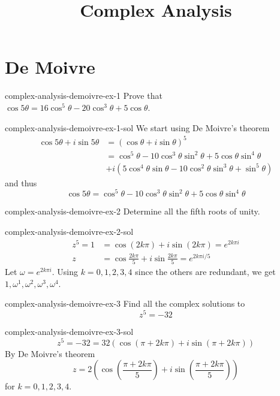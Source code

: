 \documentclass[preview]{standalone}
\begin{document}
\title{Complex Analysis}
\genpage

\section{De Moivre}

\begin{snippetexercise}{complex-analysis-demoivre-ex-1}{}
    Prove that \(\cos5\theta = 16\cos^5\theta - 20\cos^3\theta+5\cos\theta\).
\end{snippetexercise}

\begin{snippetsolution}{complex-analysis-demoivre-ex-1-sol}{}
    We start using De Moivre's theorem
    \begin{align*}
        \cos5\theta + i\sin5\theta &= (\cos\theta + i\sin\theta)^5 \\
        &= \cos^5\theta - 10\cos^3\theta\sin^2\theta + 5\cos\theta\sin^4\theta \\
            &+ i(5\cos^4\theta\sin\theta -10\cos^2\theta\sin^3\theta + \sin^5\theta)
    \end{align*}
    and thus
    \[ \cos5\theta = \cos^5\theta - 10\cos^3\theta\sin^2\theta + 5\cos\theta\sin^4\theta \]
\end{snippetsolution}

\begin{snippetexercise}{complex-analysis-demoivre-ex-2}{}
    Determine all the fifth roots of unity.
\end{snippetexercise}

\begin{snippetsolution}{complex-analysis-demoivre-ex-2-sol}{}
    \begin{align*}
        z^5 = 1 &= \cos (2k\pi) + i\sin(2k\pi) = e^{2k\pi i} \\
        z &= \cos \frac{2k\pi}{5} + i \sin \frac{2k\pi}{5} = e^{2k\pi i / 5}
    \end{align*}
    Let \(\omega = e^{2k\pi i}\). Using \(k=0,1,2,3,4\) since the others are redundant, we get
    \(1, \omega^1, \omega^2, \omega^3, \omega^4\).
\end{snippetsolution}

\begin{snippetexercise}{complex-analysis-demoivre-ex-3}{}
    Find all the complex solutions to
    \[ z^5 = -32 \]
\end{snippetexercise}

\begin{snippetsolution}{complex-analysis-demoivre-ex-3-sol}{}
    \[  z^5 = -32 = 32\left( \cos(\pi + 2k\pi) + i\sin(\pi + 2k\pi) \right) \]
    By De Moivre's theorem
    \[
        z = 2\left( 
            \cos\left(\frac{\pi + 2k\pi}{5}\right) + i\sin\left(\frac{\pi + 2k\pi}{5}\right)
        \right)
    \]
    for \(k=0,1,2,3,4\).
\end{snippetsolution}
\end{document}
